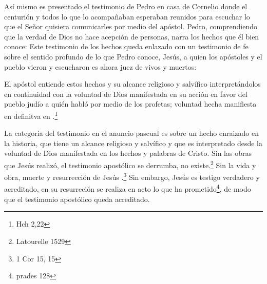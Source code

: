Así mismo es presentado el testimonio de Pedro en casa de Cornelio donde el
centurión y todos lo que lo acompañaban esperaban reunidos para escuchar lo que
el Señor quisiera comunicarles por medio del apóstol. Pedro, comprendiendo que
la verdad de Dios no hace acepción de personas, narra los hechos que él bien
conoce:  Este testimonio de los hechos queda
enlazado con un testimonio de fe sobre el sentido profundo de lo que Pedro
conoce, Jesús, a quien los apóstoles y el pueblo vieron y escucharon es ahora
juez de vivos y muertos:

El apóstol entiende estos hechos y su alcance religioso y salvífico
interpretándolos en continuidad con la voluntad de Dios manifestada en su acción
en favor del pueblo judío a quién habló por medio de los profetas; voluntad
hecha manifiesta en definitva en .\footnote{Hch 2,22}

La categoría del testimonio en el anuncio pascual es sobre un hecho enraizado en
la historia, que tiene un alcance religioso y salvífico y que es interpretado
desde la voluntad de Dios manifestada en los hechos y palabras de Cristo. Sin
las obras que Jesús realizó, el testimonio apostólico se derrumba, no
existe.\footnote{Latourelle 1529} Sin la vida y obra, muerte y resurrección de
Jesús .\footnote{1 Cor 15, 15} Sin embargo, Jesús es testigo verdadero y
acreditado, en su resurreción se realiza en acto lo que ha
prometido\footnote{prades 128}, de modo que el testimonio apostólico queda
acreditado.

